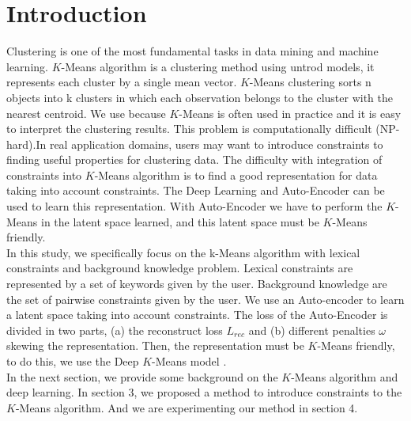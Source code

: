 \section{Introduction}\label{sec:intro}

Clustering is one of the most fundamental tasks in data mining and machine
learning. $K$-Means algorithm is a clustering method using untrod models,
it represents each cluster by a single mean vector. $K$-Means clustering sorts
n objects into k clusters in which each observation belongs to
the cluster with the nearest centroid.
We use because $K$-Means is often used in practice and it is easy to interpret 
the clustering results.
This problem is computationally
difficult (NP-hard).In real application domains, users may want to introduce 
constraints to finding 
useful properties for clustering data. The difficulty with integration of 
constraints into $K$-Means algorithm is to find a good representation for data 
taking into account constraints. The Deep Learning and Auto-Encoder can be used 
to learn this representation. With Auto-Encoder we have to perform the $K$-Means
in the latent space learned, and this latent space must be $K$-Means friendly.
\\In this study, we specifically focus on the k-Means algorithm with lexical constraints 
and background knowledge problem. Lexical constraints are represented
by a set of keywords given by the user. Background knowledge are the set of 
pairwise constraints given by the user.  We use an Auto-encoder to learn a latent space taking
into account constraints. The loss of the Auto-Encoder is divided in two parts, (a) 
the reconstruct loss $L_{rec}$ and (b) different penalties $\omega$ skewing the
representation. Then, the representation must be $K$-Means friendly, 
to do this, we use the Deep $K$-Means model \cite{Deap-K-Means}.  
\\In the next section, we provide some background on the $K$-Means algorithm and
deep learning. In section 3, we proposed a method to introduce constraints to 
the $K$-Means algorithm. And we are experimenting our method in section 4.

